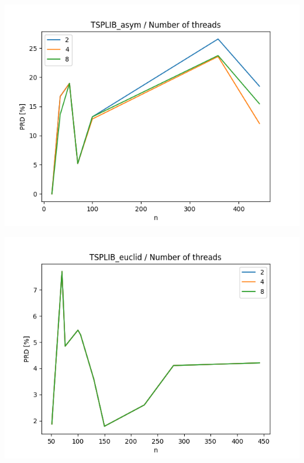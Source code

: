 \documentclass{article}
\begin{document}
\begin{center}
\includegraphics[width=\textwidth, 
                   height = 0.4\textheight, 
                   keepaspectratio]
                  {plots/tsplib_asym_12_num_of_threads} 
\end{center}

\begin{center}
\includegraphics[width=\textwidth, 
                   height = 0.4\textheight, 
                   keepaspectratio]
                  {plots/tsplib_euclid_12_num_of_threads} 
\end{center}
\end{document}
